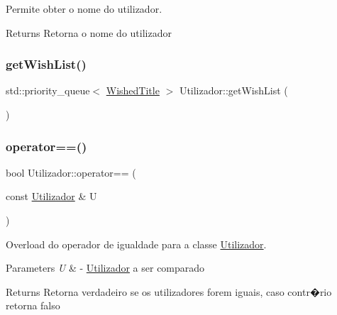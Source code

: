 Permite obter o nome do utilizador. 

\begin{DoxyReturn}{Returns}
Retorna o nome do utilizador 
\end{DoxyReturn}
\mbox{\label{class_utilizador_a8624e9e45e13e592e68164b0d7b2b7cd}} 
\subsubsection{\texorpdfstring{get\+Wish\+List()}{getWishList()}}
{\footnotesize\ttfamily std\+::priority\+\_\+queue$<$ \mbox{\hyperlink{class_wished_title}{Wished\+Title}} $>$ Utilizador\+::get\+Wish\+List (\begin{DoxyParamCaption}{ }\end{DoxyParamCaption})}

\mbox{\label{class_utilizador_abd73f24d4eb5fa0838af819e8343b1f5}} 
\subsubsection{\texorpdfstring{operator==()}{operator==()}}
{\footnotesize\ttfamily bool Utilizador\+::operator== (\begin{DoxyParamCaption}\item[{const \mbox{\hyperlink{class_utilizador}{Utilizador}} \&}]{U }\end{DoxyParamCaption})}



Overload do operador de igualdade para a classe \mbox{\hyperlink{class_utilizador}{Utilizador}}. 


\begin{DoxyParams}{Parameters}
{\em U} & -\/ \mbox{\hyperlink{class_utilizador}{Utilizador}} a ser comparado \\
\hline
\end{DoxyParams}
\begin{DoxyReturn}{Returns}
Retorna verdadeiro se os utilizadores forem iguais, caso contr�rio retorna falso 
\end{DoxyReturn}
\mbox{\label{class_utilizador_a4f3016ff86d68d548f801aa569b854dc}} 
